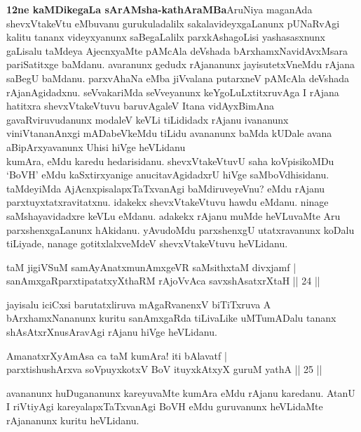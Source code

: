 \begin{artha}
\textbf{1\ndash 2ne kaMDikegaLa sArAMsha-kathAraMBa}\mdash AruNiya maganAda 
shevxVtakeVtu eMbuvanu gurukuladalilx sakalavideyxgaLanunx pUNaRvAgi 
kalitu tananx videyxyanunx saBegaLalilx parxkAshagoLisi yashasasxnunx 
gaLisalu taMdeya AjecnxyaMte pAMcAla deVshada bArxhamxNavidAvxMsara 
pariSatitxge baMdanu. avaranunx gedudx rAjananunx jayisutetxVneMdu 
rAjana saBegU baMdanu. parxvAhaNa eMba jiVvalana putarxneV pAMcAla 
deVshada rAjanAgidadxnu. seVvakariMda seVveyanunx keYgoLuLxtitxruvAga 
I rAjana hatitxra shevxVtakeVtuvu baruvAgaleV Itana vidAyxBimAna 
gavaRviruvudanunx modaleV keVLi tiLididadx rAjanu ivananunx 
viniVtananAnxgi mADabeVkeMdu tiLidu avananunx baMda kUDale avana 
aBipArxyavanunx Uhisi hiVge heVLidanu \\
kumAra, eMdu karedu hedarisidanu. shevxVtakeVtuvU saha koVpisikoMDu 
`BoVH' eMdu kaSxtirxyanige anucitavAgidadxrU hiVge saMboVdhisidanu. 
taMdeyiMda AjAcnxpisalapxTaTxvanAgi baMdiruveyeVnu? eMdu rAjanu 
parxtuyxtatxravitatxnu. idakekx shevxVtakeVtuvu hawdu eMdanu. ninage 
saMshayavidadxre keVLu eMdanu. adakekx rAjanu muMde heVLuvaMte Aru 
parxshenxgaLanunx hAkidanu. yAvudoMdu parxshenxgU utatxravanunx koDalu 
tiLiyade, nanage gotitxlalxveMdeV shevxVtakeVtuvu heVLidanu.
\end{artha}

\begin{shl}
taM jigiVSuM samAyAnatxmunAmxgeVR saMsithxtaM divxjamf | \\
sanAmxgaRparxtipatatxyXthaRM rAjoVvAca savxshAsatxrXtaH \hfill|| 24 || 
\end{shl}

\begin{artha}
jayisalu iciCxsi barutatxliruva mAgaRvanenxV biTiTxruva A 
bArxhamxNananunx kuritu sanAmxgaRda tiLivaLike uMTumADalu tananx 
shAsAtxrXnusAravAgi rAjanu hiVge heVLidanu.
\end{artha}

\begin{shl}
AmanatxrXyAmAsa ca taM kumAra! iti bAlavatf | \\
parxtishushArxva soV\s puyxkotxV BoV ituyxkAtxyX guruM yathA \hfill|| 25 || 
\end{shl}

\begin{artha}
avananunx huDugananunx kareyuvaMte kumAra eMdu rAjanu karedanu. AtanU 
I riVtiyAgi kareyalapxTaTxvanAgi BoVH eMdu guruvanunx heVLidaMte 
rAjananunx kuritu heVLidanu.
\end{artha}

